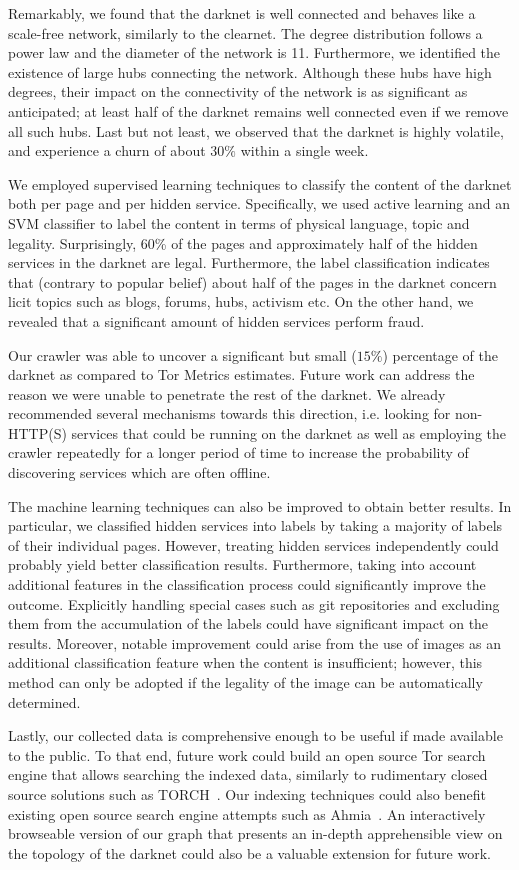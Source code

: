 Remarkably, we found that the darknet is well connected and behaves like a scale-free network, similarly to the clearnet. The degree distribution follows a power law and the diameter of the network is 11. Furthermore, we identified the existence of large hubs connecting the network. Although these hubs have  high degrees, their impact on the connectivity of the network is as significant as anticipated; at least half of the darknet remains well connected even if we remove all such hubs. Last but not least, we observed that the darknet is highly volatile, and experience a churn of about $30\%$ within a single week.

We employed supervised learning techniques to classify the content of the darknet both per page and per hidden service. Specifically, we used active learning and an SVM classifier to label the content in terms of physical language, topic and legality. 
Surprisingly, 60\% of the pages and approximately half of the hidden services in the darknet are legal. Furthermore, the label classification indicates that (contrary to popular belief) about half of the pages in the darknet concern licit topics such as blogs, forums, hubs, activism etc. On the other hand, we revealed that a significant amount of hidden services perform fraud. 

Our crawler was able to uncover a significant but small ($15\%$) percentage of the darknet as compared to Tor Metrics estimates. Future work can address the reason we were unable to penetrate the rest of the darknet. We already recommended several mechanisms towards this direction, i.e. looking for non-HTTP(S) services that could be running on the darknet as well as employing the crawler repeatedly for a longer period of time to increase the probability of discovering services which are often offline.


The machine learning techniques can also be improved to obtain better results. In particular, we classified hidden services into labels by taking a majority of labels of their individual pages. However, treating hidden services independently could probably yield better classification results.  
Furthermore, taking into account additional features in the classification process could significantly improve the outcome. Explicitly handling special cases such as git repositories and excluding them from the accumulation of the labels could have significant impact on the results. Moreover, notable improvement could arise from the use of images as an additional classification feature when the content is insufficient; however, this method can only be adopted if the legality of the image can be automatically determined.

Lastly, our collected data is comprehensive enough to be useful if made available to the public. To that end, future work could build an open source Tor search engine that allows searching the indexed data, similarly to rudimentary closed source solutions such as TORCH~\cite{torch}. Our indexing techniques could also benefit existing open source search engine attempts such as Ahmia~\cite{ahmia}. An interactively browseable version of our graph that presents an in-depth apprehensible view on the topology of the darknet could also be a valuable extension for future work.
